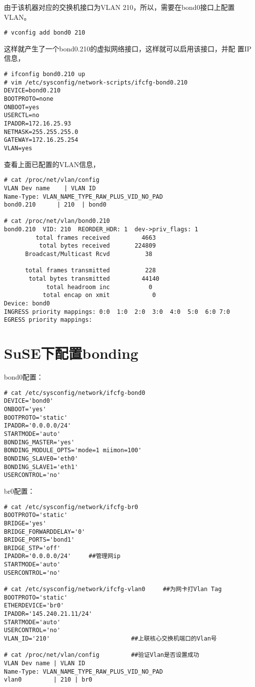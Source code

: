 由于该机器对应的交换机接口为VLAN 210，所以，需要在bond0接口上配置VLAN。

\begin{verbatim}
# vconfig add bond0 210
\end{verbatim}

这样就产生了一个bond0.210的虚拟网络接口，这样就可以启用该接口，并配
置IP信息，

\begin{verbatim}
# ifconfig bond0.210 up
# vim /etc/sysconfig/network-scripts/ifcfg-bond0.210
DEVICE=bond0.210
BOOTPROTO=none
ONBOOT=yes
USERCTL=no
IPADDR=172.16.25.93
NETMASK=255.255.255.0
GATEWAY=172.16.25.254
VLAN=yes
\end{verbatim}

查看上面已配置的VLAN信息，

\begin{verbatim}
# cat /proc/net/vlan/config
VLAN Dev name	 | VLAN ID
Name-Type: VLAN_NAME_TYPE_RAW_PLUS_VID_NO_PAD
bond0.210      | 210  | bond0

# cat /proc/net/vlan/bond0.210 
bond0.210  VID: 210	 REORDER_HDR: 1  dev->priv_flags: 1
         total frames received         4663
          total bytes received       224809
      Broadcast/Multicast Rcvd          38

      total frames transmitted          228
       total bytes transmitted         44140
            total headroom inc           0
           total encap on xmit            0
Device: bond0
INGRESS priority mappings: 0:0  1:0  2:0  3:0  4:0  5:0  6:0 7:0
EGRESS priority mappings:
\end{verbatim}

\section{SuSE下配置bonding}

bond0配置：

\begin{verbatim}
# cat /etc/sysconfig/network/ifcfg-bond0
DEVICE='bond0'
ONBOOT='yes'
BOOTPROTO='static'
IPADDR='0.0.0.0/24'   
STARTMODE='auto'
BONDING_MASTER='yes'
BONDING_MODULE_OPTS='mode=1 miimon=100'
BONDING_SLAVE0='eth0'
BONDING_SLAVE1='eth1'
USERCONTROL='no'
\end{verbatim}

br0配置：

\begin{verbatim}
# cat /etc/sysconfig/network/ifcfg-br0
BOOTPROTO='static'
BRIDGE='yes'
BRIDGE_FORWARDDELAY='0'
BRIDGE_PORTS='bond1'
BRIDGE_STP='off'
IPADDR='0.0.0.0/24'    	##管理网ip
STARTMODE='auto'
USERCONTROL='no'

# cat /etc/sysconfig/network/ifcfg-vlan0     ##为网卡打Vlan Tag
BOOTPROTO='static'
ETHERDEVICE='br0'
IPADDR='145.240.21.11/24'
STARTMODE='auto'
USERCONTROL='no'
VLAN_ID='210'                       ##上联核心交换机端口的Vlan号

# cat /proc/net/vlan/config         ##验证Vlan是否设置成功
VLAN Dev name | VLAN ID
Name-Type: VLAN_NAME_TYPE_RAW_PLUS_VID_NO_PAD
vlan0         | 210 | br0
\end{verbatim}

